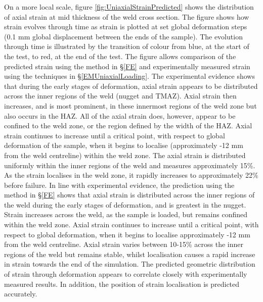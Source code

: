 On a more local scale, figure \ref{fig:UniaxialStrainPredicted} shows the distribution of axial strain at mid thickness of the weld cross section. The figure shows how strain evolves through time as strain is plotted at set global deformation steps (0.1 mm global displacement between the ends of the sample). The evolution through time is illustrated by the transition of colour from blue, at the start of the test, to red, at the end of the test. The figure allows comparison of the predicted strain using the method in \S\ref{FE} and experimentally measured strain using the techniques in \S\ref{EMUniaxialLoading}.
The experimental evidence shows that during the early stages of deformation, axial strain appears to be distributed across the inner regions of the weld (nugget and TMAZ). Axial strain then increases, and is most prominent, in these innermost regions of the weld zone but also occurs in the HAZ. All of the axial strain does, however, appear to be confined to the weld zone, or the region defined by the width of the HAZ. Axial strain continues to increase until a critical point, with respect to global deformation of the sample, when it begins to localise (approximately -12 mm from the weld centreline) within the weld zone. The axial strain is distributed uniformly within the inner regions of the weld and measures approximately 15\%. As the strain localises in the weld zone, it rapidly increases to approximately 22\% before failure. 
In line with experimental evidence, the prediction using the method in \S\ref{FE} shows that axial strain is distributed across the inner regions of the weld during the early stages of deformation, and is greatest in the nugget. Strain increases across the weld, as the sample is loaded, but remains confined within the weld zone. Axial strain continues to increase until a critical point, with respect to global deformation, when it begins to localise approximately -12 mm from the weld centreline. Axial strain varies between 10-15\% across the inner regions of the weld but remains stable, whilst localisation causes a rapid increase in strain towards the end of the simulation. The predicted geometric distribution of strain through deformation appears to correlate closely with experimentally measured results. In addition, the position of strain localisation is predicted accurately. 

